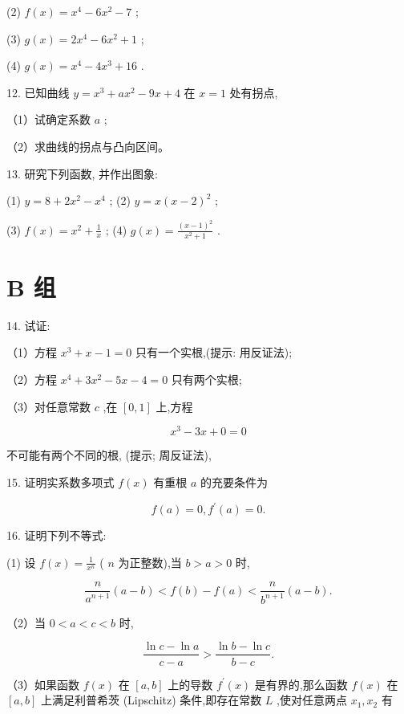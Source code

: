 \documentclass[lang=cn,newtx,10pt,scheme=chinese]{elegantbook}
\begin{document}
(2) \(f\left( x\right) = {x}^{4} - 6{x}^{2} - 7\) ;

(3) \(g\left( x\right) = 2{x}^{4} - 6{x}^{2} + 1\) ;

(4) \(g\left( x\right) = {x}^{4} - 4{x}^{3} + {16}\) .

12. 已知曲线 \(y = {x}^{3} + a{x}^{2} - {9x} + 4\) 在 \(x = 1\) 处有拐点,

（1）试确定系数 \(a\) ;

（2）求曲线的拐点与凸向区间。

13. 研究下列函数, 并作出图象:

(1) \(y = 8 + 2{x}^{2} - {x}^{4}\) ; (2) \(y = x{\left( x - 2\right) }^{2}\) ;

(3) \(f\left( x\right) = {x}^{2} + \frac{1}{x}\) ; (4) \(g\left( x\right) = \frac{{\left( x - 1\right) }^{2}}{{x}^{2} + 1}\) .

\section*{B 组}

14. 试证:

（1）方程 \({x}^{3} + x - 1 = 0\) 只有一个实根,(提示: 用反证法);

（2）方程 \({x}^{4} + 3{x}^{2} - {5x} - 4 = 0\) 只有两个实根;

（3）对任意常数 \(c\) ,在 \(\left\lbrack {0,1}\right\rbrack\) 上,方程

\[
{x}^{3} - {3x} + 0 = 0
\]

不可能有两个不同的根, (提示; 周反证法),

15. 证明实系数多项式 \(f\left( x\right)\) 有重根 \(a\) 的充要条件为

\[
f\left( a\right) = 0,{f}^{\prime }\left( a\right) = 0.
\]

16. 证明下列不等式:

(1) 设 \(f\left( x\right) = \frac{1}{{x}^{n}}\) ( \(n\) 为正整数),当 \(b > a > 0\) 时,

\[
\frac{n}{{a}^{n + 1}}\left( {a - b}\right) < f\left( b\right) - f\left( a\right) < \frac{n}{{b}^{n + 1}}\left( {a - b}\right) .
\]

（2）当 \(0 < a < c < b\) 时,

\[
\frac{\ln c - \ln a}{c - a} > \frac{\ln b - \ln c}{b - c}.
\]

（3）如果函数 \(f\left( x\right)\) 在 \(\left\lbrack {a,b}\right\rbrack\) 上的导数 \({f}^{\prime }\left( x\right)\) 是有界的,那么函数 \(f\left( x\right)\) 在 \(\left\lbrack {a,b}\right\rbrack\) 上满足利普希茨 (Lipschitz) 条件,即存在常数 \(L\) ,使对任意两点 \({x}_{1},{x}_{2}\) 有
\end{document}
